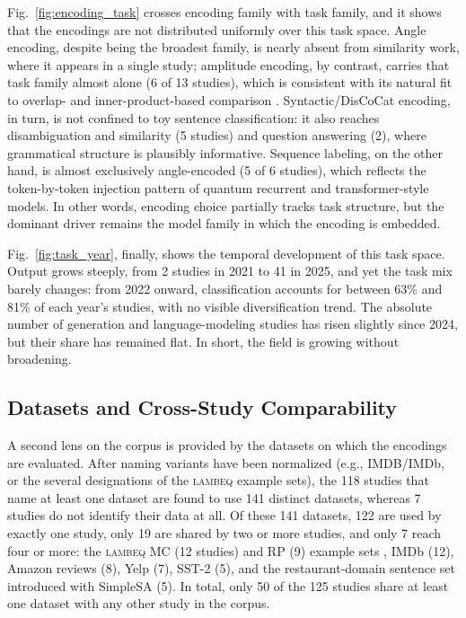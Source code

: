 \documentclass{ieeeaccess}
\begin{document}
Fig.~\ref{fig:encoding_task} crosses encoding family with task family, and it shows that the encodings are not distributed uniformly over this task space. Angle encoding, despite being the broadest family, is nearly absent from similarity work, where it appears in a single study; amplitude encoding, by contrast, carries that task family almost alone (6 of 13 studies), which is consistent with its natural fit to overlap- and inner-product-based comparison \cite{cavar_old_2026,cavar_word_2025}. Syntactic/DisCoCat encoding, in turn, is not confined to toy sentence classification: it also reaches disambiguation and similarity (5 studies) and question answering (2), where grammatical structure is plausibly informative. Sequence labeling, on the other hand, is almost exclusively angle-encoded (5 of 6 studies), which reflects the token-by-token injection pattern of quantum recurrent and transformer-style models. In other words, encoding choice partially tracks task structure, but the dominant driver remains the model family in which the encoding is embedded.

Fig.~\ref{fig:task_year}, finally, shows the temporal development of this task space. Output grows steeply, from 2 studies in 2021 to 41 in 2025, and yet the task mix barely changes: from 2022 onward, classification accounts for between 63\% and 81\% of each year's studies, with no visible diversification trend. The absolute number of generation and language-modeling studies has risen slightly since 2024, but their share has remained flat. In short, the field is growing without broadening.

\subsection{Datasets and Cross-Study Comparability}
\label{subsec:datasets_comparability}

A second lens on the corpus is provided by the datasets on which the encodings are evaluated. After naming variants have been normalized (e.g., IMDB/IMDb, or the several designations of the \textsc{lambeq} example sets), the 118 studies that name at least one dataset are found to use 141 distinct datasets, whereas 7 studies do not identify their data at all. Of these 141 datasets, 122 are used by exactly one study, only 19 are shared by two or more studies, and only 7 reach four or more: the \textsc{lambeq} MC (12 studies) and RP (9) example sets \cite{meichanetzidis_quantum_2021,lorenz_qnlp_2023}, IMDb (12), Amazon reviews (8), Yelp (7), SST-2 (5), and the restaurant-domain sentence set introduced with SimpleSA \cite{ruskanda_simple_2023} (5). In total, only 50 of the 125 studies share at least one dataset with any other study in the corpus.
\end{document}
